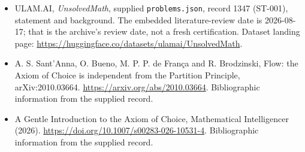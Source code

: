 \documentclass[11pt,a4paper]{article}
\begin{document}
{\small

\begin{itemize}

\item[\hypertarget{source:1347:1}{S1}] ULAM.AI, \emph{UnsolvedMath}, supplied \texttt{problems.json}, record 1347 (ST-001), statement and background. The embedded literature-review date is 2026-08-17; that is the archive’s review date, not a fresh certification. Dataset landing page: \url{https://huggingface.co/datasets/ulamai/UnsolvedMath}.

\item[\hypertarget{source:1347:2}{S2}] A. S. Sant'Anna, O. Bueno, M. P. P. de França and R. Brodzinski, Flow: the Axiom of Choice is independent from the Partition Principle, arXiv:2010.03664. \url{https://arxiv.org/abs/2010.03664}. Bibliographic information from the supplied record.

\item[\hypertarget{source:1347:3}{S3}] A Gentle Introduction to the Axiom of Choice, Mathematical Intelligencer (2026). \url{https://doi.org/10.1007/s00283-026-10531-4}. Bibliographic information from the supplied record.

\end{itemize}

}

\label{end:1347}
\end{document}
